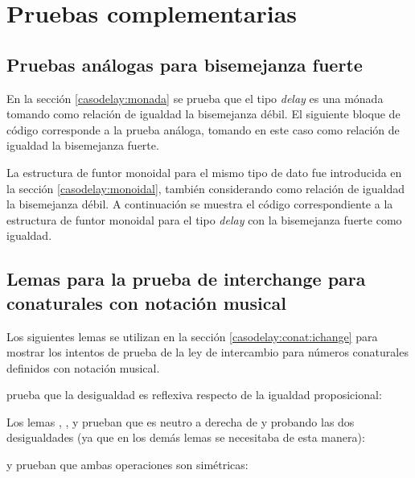 \chapter{Pruebas complementarias}\label{apendice:pruebas}

\section{Pruebas análogas para bisemejanza fuerte}\label{apendice:fuerte}
 
En la sección \ref{casodelay:monada} se prueba que el tipo \textit{delay} es una mónada tomando como relación de igualdad la bisemejanza débil. El siguiente bloque de código corresponde a la prueba análoga, tomando en este caso como relación de igualdad la bisemejanza fuerte. 


La estructura de funtor monoidal para el mismo tipo de dato fue introducida en la sección \ref{casodelay:monoidal}, también considerando como relación de igualdad la bisemejanza débil. A continuación se muestra el código correspondiente a la estructura de funtor monoidal para el tipo \textit{delay} con la bisemejanza fuerte como igualdad.


\section{Lemas para la prueba de interchange para conaturales con notación musical}\label{apendice:lemasmus}

Los siguientes lemas se utilizan en la sección \ref{casodelay:conat:ichange} para mostrar los intentos de prueba de la ley de intercambio para números conaturales definidos con notación musical. 

\AgdaFunction{$\equiv\Rightarrow\gtrsim$} prueba que la desigualdad es reflexiva respecto de la igualdad proposicional:

Los lemas , ,  y  prueban que  es neutro a derecha de  y  probando las dos desigualdades (ya que en los demás lemas se necesitaba de esta manera):

 y  prueban que ambas operaciones son simétricas:

